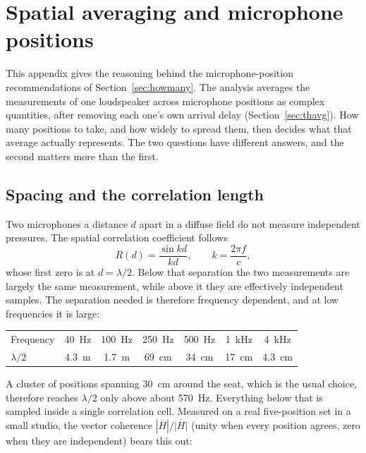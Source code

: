 \chapter{Spatial averaging and microphone positions}\label{ch:spatial}

This appendix gives the reasoning behind the microphone-position recommendations of Section~\ref{sec:howmany}. The analysis averages the measurements of one loudspeaker across microphone positions as complex quantities, after removing each one's own arrival delay (Section~\ref{sec:thavg}). How many positions to take, and how widely to spread them, then decides what that average actually represents. The two questions have different answers, and the second matters more than the first.

\section{Spacing and the correlation length}
Two microphones a distance $d$ apart in a diffuse field do not measure independent pressures. The spatial correlation coefficient follows~\cite{Cook1955}
\begin{equation}
  R(d) = \frac{\sin kd}{kd}, \qquad k = \frac{2\pi f}{c},
  \label{eq:spatialcorr}
\end{equation}
whose first zero is at $d = \lambda/2$. Below that separation the two measurements are largely the same measurement, while above it they are effectively independent samples. The separation needed is therefore frequency dependent, and at low frequencies it is large:

\begin{center}
\begin{tabular}{lcccccc}
\toprule
Frequency & \SI{40}{\hertz} & \SI{100}{\hertz} & \SI{250}{\hertz}
          & \SI{500}{\hertz} & \SI{1}{\kilo\hertz} & \SI{4}{\kilo\hertz}\\
$\lambda/2$ & \SI{4.3}{\metre} & \SI{1.7}{\metre} & \SI{69}{\centi\metre}
            & \SI{34}{\centi\metre} & \SI{17}{\centi\metre} & \SI{4.3}{\centi\metre}\\
\bottomrule
\end{tabular}
\end{center}

\noindent A cluster of positions spanning \SI{30}{\centi\metre} around the seat, which is the usual choice, therefore reaches $\lambda/2$ only above about \SI{570}{\hertz}. Everything below that is sampled inside a single correlation cell. Measured on a real five-position set in a small studio, the vector coherence $|\overline{H}| / \overline{|H|}$ (unity when every position agrees, zero when they are independent) bears this out:

